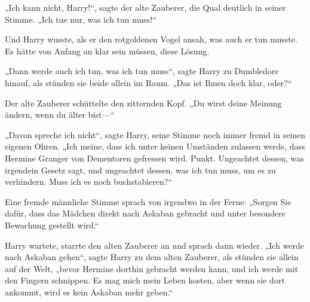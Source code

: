 „Ich kann nicht, Harry!“, sagte der alte Zauberer, die Qual deutlich in seiner Stimme. „Ich tue nur, was ich tun muss!“

Und Harry wusste, als er den rotgoldenen Vogel ansah, was auch er tun musste. Es hätte von Anfang an klar sein müssen, diese Lösung.

„Dann werde auch ich tun, was ich tun muss“, sagte Harry zu Dumbledore hinauf, als stünden sie beide allein im Raum. „Das ist Ihnen doch klar, oder?“

Der alte Zauberer schüttelte den zitternden Kopf. „Du wirst deine Meinung ändern, wenn du älter bist—“

„Davon spreche ich nicht“, sagte Harry, seine Stimme noch immer fremd in seinen eigenen Ohren. „Ich meine, dass ich unter keinen Umständen zulassen werde, dass Hermine Granger von Dementoren gefressen wird. Punkt. Ungeachtet dessen, was irgendein Gesetz sagt, und ungeachtet dessen, was ich tun muss, um es zu verhindern. Muss ich es noch buchstabieren?“

Eine fremde männliche Stimme sprach von irgendwo in der Ferne: „Sorgen Sie dafür, dass das Mädchen direkt nach Askaban gebracht und unter besondere Bewachung gestellt wird.“

Harry wartete, starrte den alten Zauberer an und sprach dann wieder.
„Ich werde nach Askaban gehen“, sagte Harry zu dem alten Zauberer, als stünden sie allein auf der Welt, „bevor Hermine dorthin gebracht werden kann, und ich werde mit den Fingern schnippen. Es mag mich mein Leben kosten, aber wenn sie dort ankommt, wird es kein Askaban mehr geben.“

